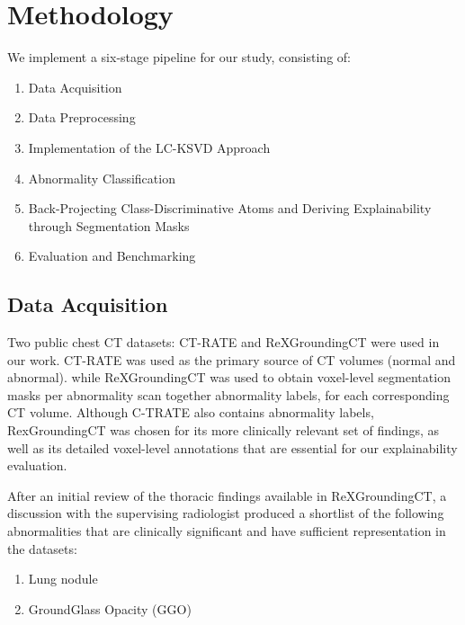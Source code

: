 ﻿\chapter{Methodology}

We implement a six-stage pipeline for our study, consisting of:
\begin{enumerate}
    \item Data Acquisition
    \item Data Preprocessing
    \item Implementation of the LC-KSVD Approach
    \item Abnormality Classification
    \item Back-Projecting Class-Discriminative Atoms and Deriving Explainability through Segmentation Masks
    \item Evaluation and Benchmarking
\end{enumerate}


\section{Data Acquisition}
Two public chest CT datasets: CT-RATE\cite{ctrate} and ReXGroundingCT\cite{rexgroundingct} were used in our work.
CT-RATE was used as the primary source of CT volumes (normal and abnormal).
while ReXGroundingCT was used to obtain voxel-level segmentation masks per abnormality scan together abnormality labels,
for each corresponding CT volume. Although C-TRATE also contains abnormality labels, RexGroundingCT was chosen
for its more clinically relevant set of findings, as well as its detailed voxel-level annotations that are essential for our explainability evaluation.

After an initial review of the thoracic findings available in ReXGroundingCT, a discussion with the supervising radiologist
produced a shortlist of the following abnormalities that are clinically significant and have sufficient representation in the datasets:
\begin{enumerate}
    \item Lung nodule
    \item GroundGlass Opacity (GGO)
\end{enumerate}

